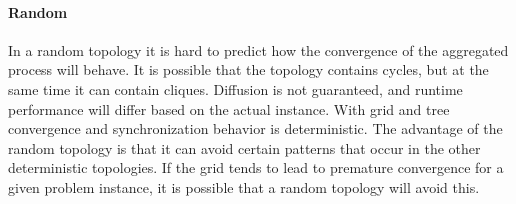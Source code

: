 \paragraph{Random}
In a random topology it is hard to predict how the convergence of the aggregated process will behave. It is possible that the topology contains cycles, but at the same time it can contain cliques. Diffusion is not guaranteed, and runtime performance will differ based on the actual instance. With grid and tree convergence and synchronization behavior is deterministic. The advantage of the random topology is that it can avoid certain patterns that occur in the other deterministic topologies. If the grid tends to lead to premature convergence for a given problem instance, it is possible that a random topology will avoid this.
%
%
